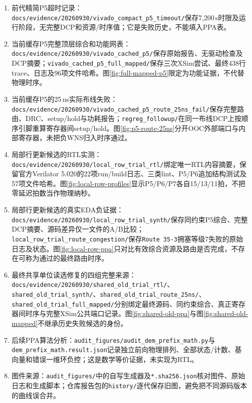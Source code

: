 \documentclass[UTF8,fontset=fandol,11pt,a4paper,openany]{ctexrep}
\newcommand{\code}[1]{\nolinkurl{#1}}
\begin{document}
\begin{enumerate}
\item 前代精简P5超时记录：\code{docs/evidence/20260930/vivado_compact_p5_timeout/}保存7,200\,s时限及运行阶段，无完整DCP和资源/时序值；它是失败历史，不能填入PPA表。
\item 当前缓存P5完整顶层综合和功能网表：\code{docs/evidence/20260930/vivado_cached_p5/}保存原始报告、无驱动检查及DCP摘要；\code{vivado_cached_p5_full_mapped/}保存三次XSim尝试、最终438行trace、日志及96项文件哈希。图\ref{fig:full-mapped-p5}限定为功能证据，不代替物理时序。
\item 当前缓存P5的25\,ns实际布线失败：\code{docs/evidence/20260930/vivado_cached_p5_route_25ns_fail/}保存完整路由、DRC、setup/hold与功耗报告；\code{regreg_followup/}在同一布线DCP上按顺序引脚重算寄存器间setup/hold。图\ref{fig:p5-route-25ns}分开OOC外部端口与内部寄存器，未把负WNS归入时序通过。
\item 局部行更新候选的RTL实测：\code{docs/evidence/20260930/local_row_trial_rtl/}绑定唯一RTL内容摘要，保留官方Verilator 5.020的22项run/build日志、三类lint、P5/P6追加结构测试及57项文件哈希。图\ref{fig:local-row-profiles}显示P5/P6/P7各自15/13/11拍，不把零延迟拍数当作物理纳秒。
\item 局部行更新候选的真实EDA负证据：\code{docs/evidence/20260930/local_row_trial_synth/}保存同约束P5综合、完整DCP摘要、源码差异仅一文件的A/B比较；\code{local_row_trial_route_congestion/}保存\code{Route 35-3}拥塞等级7失败的原始日志及状态。图\ref{fig:local-row-ppa}只对比有效综合资源及路由是否完成，不存在可称为通过的最终路由时序。
\item 最终共享单位读选修复的四组完整来源：\code{docs/evidence/20260930/shared_old_trial_rtl/}、\code{shared_old_trial_synth/}、\code{shared_old_trial_route_25ns/}、\code{shared_old_trial_full_mapped/}分别绑定最终源码、同约束综合、真正寄存器间时序与完整XSim公共端口记录。图\ref{fig:shared-old-ppa}与图\ref{fig:shared-old-mapped}不继承历史失败候选的身份。
\item 后续PPA算法分析：\code{audit_figures/audit_dem_prefix_math.py}与\code{dem_prefix_math.result.json}记录独立前向物理排列、全部状态/计数、基向量和错误一维环负控；这是数学等价证据，未实现为RTL。
\item 图件来源：\code{audit_figures/}中的自写生成器及\code{*.sha256.json}核对图件、原始日志和生成脚本；仓库报告包的\code{history/}逐代保存旧图，避免把不同源码版本的曲线误合并。
\end{enumerate}
\end{document}
